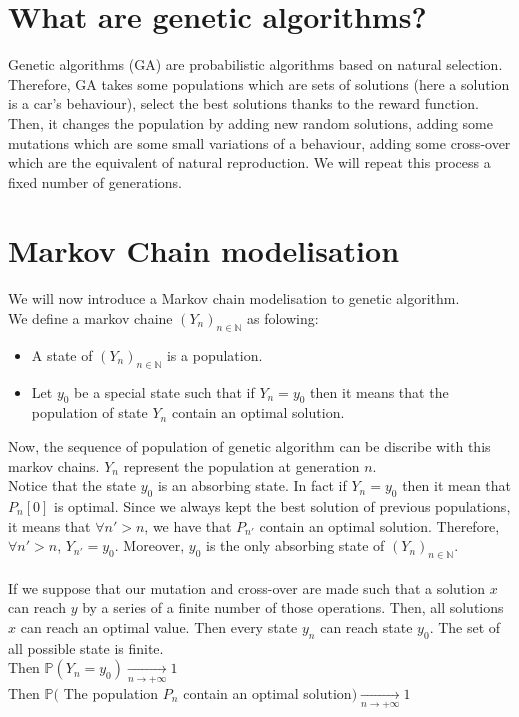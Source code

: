 \documentclass[11pt,a4paper]{article}
\newcommand{\mlist}[1]{\begin{itemize}[noitemsep,topsep=0pt]#1\end{itemize}}
\begin{document}
		\section{What are genetic algorithms?}
Genetic algorithms (GA) are probabilistic algorithms based on natural selection. Therefore, GA takes some populations which are sets of solutions (here a solution is a car's behaviour), select the best solutions thanks to the reward function. Then, it changes the population by adding new random solutions, adding some mutations which are some small variations of a behaviour, adding some cross-over which are the equivalent of natural reproduction. We will repeat this process a fixed number of generations.
		
		\section{Markov Chain modelisation}
We will now introduce a Markov chain modelisation to genetic algorithm.\\
We define a markov chaine $(Y_n)_{n\in\mathbb{N}}$ as folowing:
\mlist{
\item A state of $(Y_n)_{n\in\mathbb{N}}$ is a population.
\item Let $y_0$ be a special state such that if $Y_n = y_0$ then it means that the population of state $Y_n$ contain an optimal solution.
}
Now, the sequence of population of genetic algorithm can be discribe with this markov chains. $Y_n$ represent the population at generation $n$.\\
Notice that the state $y_0$ is an absorbing state. In fact if $Y_n = y_0$ then it mean that $P_n[0]$ is optimal. Since we always kept the best solution of previous populations, it means that $\forall n'>n$, we have that $P_{n'}$ contain an optimal solution. Therefore, $\forall n'>n$, $Y_{n'} = y_0$. Moreover, $y_0$ is the only absorbing state of $(Y_n)_{n\in\mathbb{N}}$.\\
\\
If we suppose that our mutation and cross-over are made such that a solution $x$ can reach $y$ by a series of a finite number of those operations. Then, all solutions $x$ can reach an optimal value. Then every state $y_n$ can reach state $y_0$. The set of all possible state is finite.\\
Then $\mathbb{P}(Y_n = y_0) \underset{n \rightarrow +\infty}{\rightarrow} 1$\\
Then $\mathbb{P}($ The population $P_n$ contain an optimal solution$) \underset{n \rightarrow +\infty}{\rightarrow} 1$
		
\end{document}

